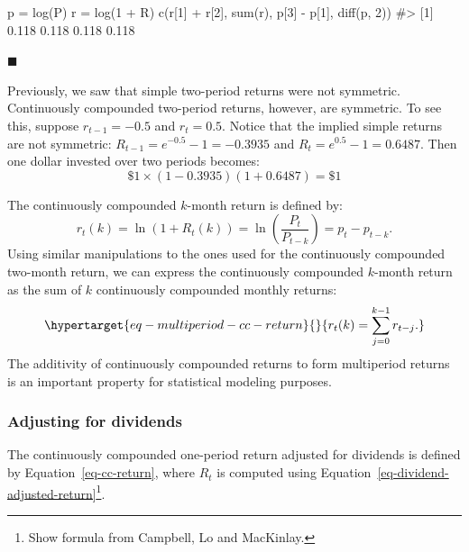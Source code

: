 \documentclass[
  letterpaper,
  DIV=11,
  numbers=noendperiod]{scrreprt}
\newenvironment{Shaded}{\begin{snugshade}}{\end{snugshade}}
\newcommand{\CommentTok}[1]{\textcolor[rgb]{0.37,0.37,0.37}{#1}}
\newcommand{\DecValTok}[1]{\textcolor[rgb]{0.68,0.00,0.00}{#1}}
\newcommand{\FunctionTok}[1]{\textcolor[rgb]{0.28,0.35,0.67}{#1}}
\newcommand{\NormalTok}[1]{\textcolor[rgb]{0.00,0.23,0.31}{#1}}
\newcommand{\OtherTok}[1]{\textcolor[rgb]{0.00,0.23,0.31}{#1}}
\newcommand{\SpecialCharTok}[1]{\textcolor[rgb]{0.37,0.37,0.37}{#1}}
\theoremstyle{definition}
\theoremstyle{definition}
\theoremstyle{remark}
\begin{document}
\begin{Shaded}
\begin{Highlighting}[]
\NormalTok{p }\OtherTok{=} \FunctionTok{log}\NormalTok{(P) }
\NormalTok{r }\OtherTok{=} \FunctionTok{log}\NormalTok{(}\DecValTok{1} \SpecialCharTok{+}\NormalTok{ R) }
\FunctionTok{c}\NormalTok{(r[}\DecValTok{1}\NormalTok{] }\SpecialCharTok{+}\NormalTok{ r[}\DecValTok{2}\NormalTok{], }\FunctionTok{sum}\NormalTok{(r), p[}\DecValTok{3}\NormalTok{] }\SpecialCharTok{{-}}\NormalTok{ p[}\DecValTok{1}\NormalTok{], }\FunctionTok{diff}\NormalTok{(p, }\DecValTok{2}\NormalTok{))}
\CommentTok{\#\textgreater{} [1] 0.118 0.118 0.118 0.118}
\end{Highlighting}
\end{Shaded}

\hfill{}\(\blacksquare\)

Previously, we saw that simple two-period returns were not symmetric.
Continuously compounded two-period returns, however, are symmetric. To
see this, suppose \(r_{t-1}=-0.5\) and \(r_{t}=0.5\). Notice that the
implied simple returns are not symmetric: \(R_{t-1}=e^{-0.5}-1=-0.3935\)
and \(R_{t}=e^{0.5}-1=0.6487\). Then one dollar invested over two
periods becomes: \[\$1 \times (1-0.3935)(1+0.6487) = \$1\]

The continuously compounded \(k\)-month return is defined by:
\[r_{t}(k)=\ln(1+R_{t}(k))=\ln\left(\frac{P_{t}}{P_{t-k}}\right)=p_{t}-p_{t-k}.\]
Using similar manipulations to the ones used for the continuously
compounded two-month return, we can express the continuously compounded
\(k\)-month return as the sum of \(k\) continuously compounded monthly
returns:
\begin{equation}\protect\hypertarget{eq-multiperiod-cc-return}{}{
r_{t}(k)=\sum_{j=0}^{k-1}r_{t-j}.
}\label{eq-multiperiod-cc-return}\end{equation} The additivity of
continuously compounded returns to form multiperiod returns is an
important property for statistical modeling purposes.

\hypertarget{adjusting-for-dividends-1}{%
\subsubsection{Adjusting for
dividends}\label{adjusting-for-dividends-1}}

The continuously compounded one-period return adjusted for dividends is
defined by Equation~\ref{eq-cc-return}, where \(R_{t}\) is computed
using Equation~\ref{eq-dividend-adjusted-return}\footnote{Show formula
  from Campbell, Lo and MacKinlay.}.
\end{document}

